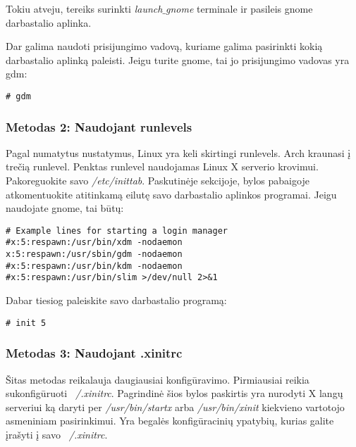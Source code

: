         Tokiu atveju, tereiks surinkti \textsl{launch$\_$gnome}
        terminale ir pasileis gnome darbastalio aplinka.

        Dar galima naudoti prisijungimo vadovą, kuriame galima
        pasirinkti kokią darbastalio aplinką paleisti. Jeigu turite
        gnome, tai jo prisijungimo vadovas yra gdm:

        \begin{verbatim}
# gdm
        \end{verbatim}

      \subsubsection{Metodas 2: Naudojant runlevels}

        Pagal numatytus nustatymus, Linux yra keli skirtingi
        runlevels. Arch kraunasi į trečią runlevel. Penktas runlevel
        naudojamas Linux X serverio krovimui. Pakoreguokite savo
        \textsl{/etc/inittab}. Paskutinėje sekcijoje, bylos pabaigoje
        atkomentuokite atitinkamą eilutę savo darbastalio aplinkos
        programai. Jeigu naudojate gnome, tai būtų:

        \begin{verbatim}
# Example lines for starting a login manager
#x:5:respawn:/usr/bin/xdm -nodaemon
x:5:respawn:/usr/sbin/gdm -nodaemon
#x:5:respawn:/usr/bin/kdm -nodaemon
#x:5:respawn:/usr/bin/slim >/dev/null 2>&1
        \end{verbatim}

        Dabar tiesiog paleiskite savo darbastalio programą:

        \begin{verbatim}
# init 5
        \end{verbatim}

      \subsubsection{Metodas 3: Naudojant .xinitrc}

        Šitas metodas reikalauja daugiausiai
        konfigūravimo. Pirmiausiai reikia sukonfigūruoti
        \textsl{~/.xinitrc}. Pagrindinė šios bylos paskirtis yra
        nurodyti X langų serveriui ką daryti per
        \textsl{/usr/bin/startx} arba \textsl{/usr/bin/xinit}
        kiekvieno vartotojo asmeniniam pasirinkimui. Yra begalės
        konfigūracinių ypatybių, kurias galite įrašyti į savo
        \textsl{~/.xinitrc}.

